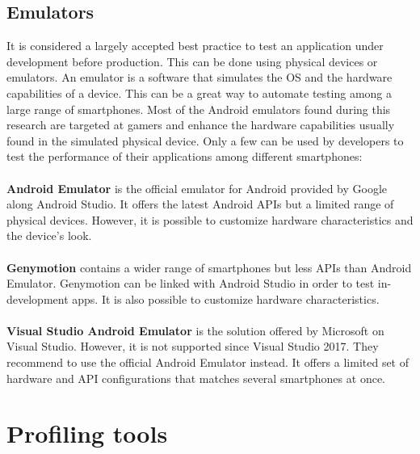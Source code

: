 \documentclass{kththesis}
\begin{document}
\subsection{Emulators}
    It is considered a largely accepted best practice to test an application under development before production. This can be done using physical devices or emulators. An emulator is a software that simulates the OS and the hardware capabilities of a device\cite{emulator_def}. This can be a great way to automate testing among a large range of smartphones. Most of the Android emulators found during this research are targeted at gamers and enhance the hardware capabilities usually found in the simulated physical device. Only a few can be used by developers to test the performance of their applications among different smartphones:
    
\paragraph{}
\textbf{Android Emulator} \cite{android_emulator} is the official emulator for Android provided by Google along Android Studio. It offers the latest Android APIs but a limited range of physical devices. However, it is possible to customize hardware characteristics and the device's look.

\paragraph{}
\textbf{Genymotion} \cite{genymotion_emulator} contains a wider range of smartphones but less APIs than Android Emulator. Genymotion can be linked with Android Studio in order to test in-development apps. It is also possible to customize hardware characteristics.

\paragraph{}
\textbf{Visual Studio Android Emulator} \cite{microsoft_emulator} is the solution offered by Microsoft on Visual Studio. However, it is not supported since Visual Studio 2017. They recommend to use the official Android Emulator instead. It offers a limited set of hardware and API configurations that matches several smartphones at once. 

\section{Profiling tools}
\end{document}
